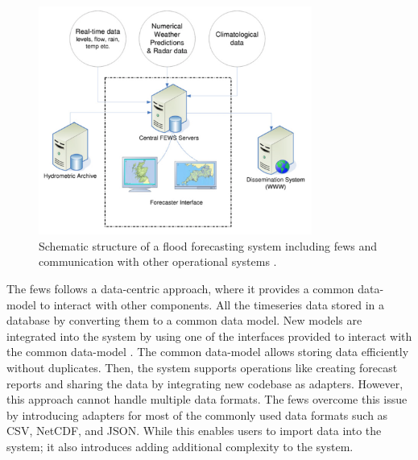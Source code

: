 \begin{figure}[htp]
    \centering
    \includegraphics[width=0.8\textwidth]{lit/fews/Schematic-structure-of-a-fl-ood-forecasting-system-showing-the-position-of-Delft-FEWS_W640.png}
    \caption[Schematic structure of a flood forecasting system including \acrshort{fews} and communication among other operational systems]{Schematic structure of a flood forecasting system including \acrshort{fews} and communication with other operational systems \cite{Werner2013TheSystem}.}
    \label{fi:fews_schematic}
\end{figure}

The \acrshort{fews} follows a data-centric approach, where it provides a common data-model to interact with other components. All the timeseries data stored in a database by converting them to a common data model. New models are integrated into the system by using one of the interfaces provided to interact with the common data-model \cite{Werner2013TheSystem}. The common data-model allows storing data efficiently without duplicates. Then, the system supports operations like creating forecast reports and sharing the data by integrating new codebase as adapters. However, this approach cannot handle multiple data formats. The \acrshort{fews} overcome this issue by introducing adapters for most of the commonly used data formats such as CSV, NetCDF, and JSON. While this enables users to import data into the system; it also introduces adding additional complexity to the system.

